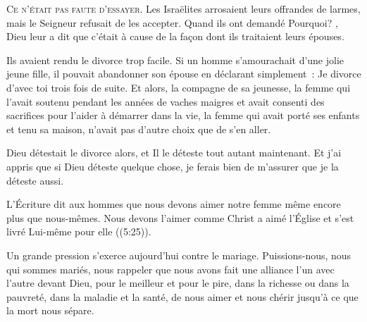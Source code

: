 




\lettrine{C}{e n'était pas faute d'essayer.} Les Israëlites arrosaient
 leurs offrandes de larmes, mais le Seigneur refusait de les accepter.
 Quand ils ont demandé \og Pourquoi? \fg{}, Dieu leur a dit que c'était
 à cause de la façon dont ils traitaient leurs épouses. 

Ils avaient rendu le divorce trop facile. Si un homme s'amourachait
 d'une jolie jeune fille, il pouvait abandonner son épouse en déclarant
 simplement~:  \og Je divorce d'avec toi \fg{}
 trois fois de suite. Et alors, la compagne de sa jeunesse,
 la femme qui l'avait soutenu pendant les années de vaches maigres
 et avait consenti des sacrifices pour l'aider à démarrer dans la vie,
 la femme qui avait porté ses enfants et tenu sa maison,
 n'avait pas d'autre choix que de s'en aller. 


Dieu détestait le divorce alors, et Il le déteste tout autant maintenant.
 Et j'ai appris que si Dieu déteste quelque chose,
 je ferais bien de m'assurer que je la déteste aussi. 

L'Écriture dit aux hommes que nous devons aimer notre femme même encore plus
 que nous-mêmes. Nous devons l'aimer comme \og Christ a aimé l'Église
 et s'est livré Lui-même pour elle \fg{} ((5:25)). 

Un grande pression s'exerce aujourd'hui contre le mariage.
 Puissions-nous, nous qui sommes mariés, nous rappeler que nous avons fait
 une alliance l'un avec l'autre devant Dieu, \og pour le meilleur
 et pour le pire, dans la richesse ou dans la pauvreté, dans la maladie
 et la santé, de nous aimer et nous chérir
 jusqu'à ce que la mort nous sépare. \fg{}

\dvrule



